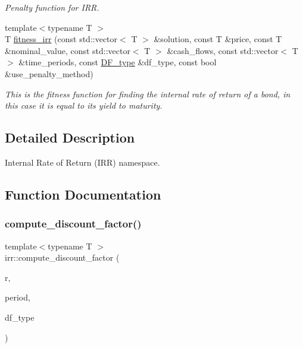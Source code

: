 \begin{DoxyCompactItemize}
\begin{DoxyCompactList}\small\item\em Penalty function for I\+RR. \end{DoxyCompactList}\item 
{\footnotesize template$<$typename T $>$ }\\T \hyperlink{namespaceirr_aced01c5e5ef9e171a3b892275d442f8d}{fitness\+\_\+irr} (const std\+::vector$<$ T $>$ \&solution, const T \&price, const T \&nominal\+\_\+value, const std\+::vector$<$ T $>$ \&cash\+\_\+flows, const std\+::vector$<$ T $>$ \&time\+\_\+periods, const \hyperlink{namespaceutilities_ad4290e607d0651ce53db6e5c776aca7c}{D\+F\+\_\+type} \&df\+\_\+type, const bool \&use\+\_\+penalty\+\_\+method)
\begin{DoxyCompactList}\small\item\em This is the fitness function for finding the internal rate of return of a bond, in this case it is equal to its yield to maturity. \end{DoxyCompactList}\end{DoxyCompactItemize}


\subsection{Detailed Description}
Internal Rate of Return (I\+RR) namespace. 

\subsection{Function Documentation}
\mbox{\label{namespaceirr_ae00c3409ca39fa2dc47ce61da4169a66}} 
\subsubsection{\texorpdfstring{compute\+\_\+discount\+\_\+factor()}{compute\_discount\_factor()}}
{\footnotesize\ttfamily template$<$typename T $>$ \\
irr\+::compute\+\_\+discount\+\_\+factor (\begin{DoxyParamCaption}\item[{const T \&}]{r,  }\item[{const T \&}]{period,  }\item[{const \hyperlink{namespaceutilities_ad4290e607d0651ce53db6e5c776aca7c}{D\+F\+\_\+type} \&}]{df\+\_\+type }\end{DoxyParamCaption})}



